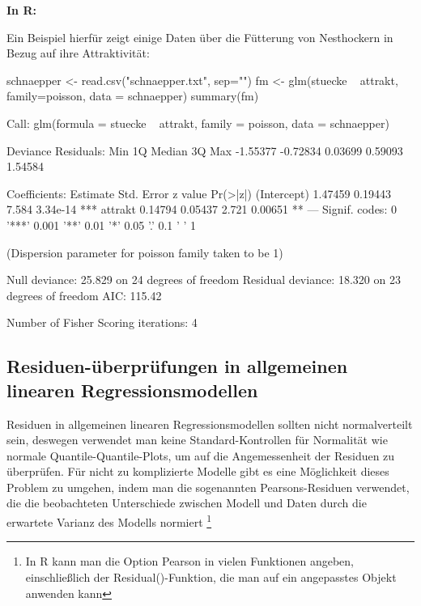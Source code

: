 \documentclass[a4paper,twoside]{tufte-book}\usepackage[]{graphicx}\usepackage[]{color}
\begin{document}
\vspace{1cm}
\begin{fullwidth}
\begin{mdframed}
    
\textbf{In R:} 

Ein Beispiel hierfür zeigt einige Daten über die Fütterung von Nesthockern in Bezug auf ihre Attraktivität:


\begin{Schunk}
\begin{Sinput}
schnaepper <- read.csv("schnaepper.txt", sep="")
fm <- glm(stuecke ~ attrakt, family=poisson, data = schnaepper)
summary(fm)
\end{Sinput}
\begin{Soutput}

Call:
glm(formula = stuecke ~ attrakt, family = poisson, data = schnaepper)

Deviance Residuals: 
     Min        1Q    Median        3Q       Max  
-1.55377  -0.72834   0.03699   0.59093   1.54584  

Coefficients:
            Estimate Std. Error z value Pr(>|z|)    
(Intercept)  1.47459    0.19443   7.584 3.34e-14 ***
attrakt      0.14794    0.05437   2.721  0.00651 ** 
---
Signif. codes:  0 '***' 0.001 '**' 0.01 '*' 0.05 '.' 0.1 ' ' 1

(Dispersion parameter for poisson family taken to be 1)

    Null deviance: 25.829  on 24  degrees of freedom
Residual deviance: 18.320  on 23  degrees of freedom
AIC: 115.42

Number of Fisher Scoring iterations: 4
\end{Soutput}
\end{Schunk}

\end{mdframed}
\end{fullwidth} 


\subsection{Residuen-überprüfungen in allgemeinen linearen Regressionsmodellen}

Residuen in allgemeinen linearen Regressionsmodellen sollten nicht normalverteilt sein, deswegen verwendet man keine Standard-Kontrollen für Normalität wie normale Quantile-Quantile-Plots, um auf die Angemessenheit der Residuen zu überprüfen. Für nicht zu komplizierte Modelle gibt es eine Möglichkeit dieses Problem zu umgehen, indem man die sogenannten Pearsons-Residuen verwendet, die die beobachteten Unterschiede zwischen Modell und Daten durch die erwartete Varianz des Modells normiert \footnote{In R kann man die Option Pearson in vielen Funktionen angeben, einschließlich der Residual()-Funktion, die man auf ein angepasstes Objekt anwenden kann}
\end{document}
